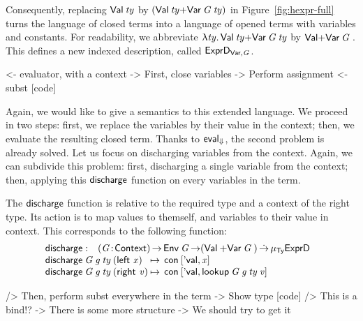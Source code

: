 Consequently, replacing $\Val{\V{ty}}$ by
$(\SUM{\Val{\V{ty}}}{\Var{\V{G}}{\V{ty}}})$ in
Figure~\ref{fig:hexpr-full} turns the language of closed terms into a
language of opened terms with variables and constants. For
readability, we abbreviate $\LAM{\V{ty}}
\SUM{\Val{\V{ty}}}{\Var{\V{G}}{\V{ty}}}$ by
$\SUM{\SYMBVal}{\Var{\V{G}}{}}$.  This defines a new indexed description,
called $\HExprVarD{\V{G}}$.

\begin{wstructure}
        <- evaluator, with a context
            -> First, close variables
                -> Perform assignment
                <- subst [code]
\end{wstructure}

\newcommand{\discharge}{\F{discharge}}

Again, we would like to give a semantics to this extended language. We
proceed in two steps: first, we replace the variables by their value
in the context; then, we evaluate the resulting closed term. Thanks to
$\evalH$, the second problem is already solved. Let us focus on
discharging variables from the context. Again, we can subdivide this
problem: first, discharging a single variable from the context; then,
applying this $\discharge$ function on every variables in the term.

The $\discharge$ function is relative to the required type and a
context of the right type. Its action is to map values to themself,
and variables to their value in context. This corresponds to the
following function:
%
\[\stk{
\begin{array}{@{}ll}
\discharge : & \PI{\V{G}}{\Ctxt}
               \Env{\V{G}} \To 
              (\SUM{\Val{\V{}}}{\Var{\V{G}}{}}) \DotTo
               \IMu{\Ty}{\HExprD}{}
\end{array} \\
\begin{array}{@{}l@{\:\mapsto\:\:}l}
\discharge\: \V{G}\: \V{g}\: \V{ty}\: (\SumLeft \V{x})  & 
    \Con{\pair{\SYMBEval}{\V{x}}{}} \\
\discharge\: \V{G}\: \V{g}\: \V{ty}\: (\SumRight \V{v}) &
    \Con{\pair{\SYMBEval}{\lookup{\V{G}}{\V{g}}{\V{ty}}{\V{v}}}{}}
\end{array}
}\]

\begin{wstructure}
            /> Then, perform subst everywhere in the term
                -> Show type [code]
                /> This is a bind!?
                -> There is some more structure 
                    -> We should try to get it
\end{wstructure}

